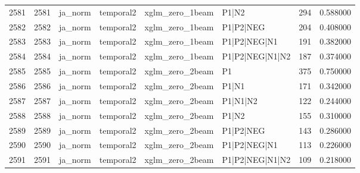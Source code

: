 \begin{tabular}{lrllllrr}
2581 & 2581 & ja_norm & temporal2 & xglm_zero_1beam & P1|N2 & 294 & 0.588000 \\
2582 & 2582 & ja_norm & temporal2 & xglm_zero_1beam & P1|P2|NEG & 204 & 0.408000 \\
2583 & 2583 & ja_norm & temporal2 & xglm_zero_1beam & P1|P2|NEG|N1 & 191 & 0.382000 \\
2584 & 2584 & ja_norm & temporal2 & xglm_zero_1beam & P1|P2|NEG|N1|N2 & 187 & 0.374000 \\
2585 & 2585 & ja_norm & temporal2 & xglm_zero_2beam & P1 & 375 & 0.750000 \\
2586 & 2586 & ja_norm & temporal2 & xglm_zero_2beam & P1|N1 & 171 & 0.342000 \\
2587 & 2587 & ja_norm & temporal2 & xglm_zero_2beam & P1|N1|N2 & 122 & 0.244000 \\
2588 & 2588 & ja_norm & temporal2 & xglm_zero_2beam & P1|N2 & 155 & 0.310000 \\
2589 & 2589 & ja_norm & temporal2 & xglm_zero_2beam & P1|P2|NEG & 143 & 0.286000 \\
2590 & 2590 & ja_norm & temporal2 & xglm_zero_2beam & P1|P2|NEG|N1 & 113 & 0.226000 \\
2591 & 2591 & ja_norm & temporal2 & xglm_zero_2beam & P1|P2|NEG|N1|N2 & 109 & 0.218000 \\
\bottomrule
\end{tabular}
